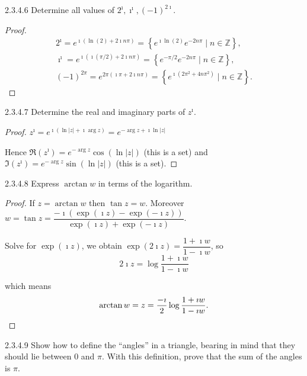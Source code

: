 \begin{problem}{2.3.4.6}
Determine all values of \( 2^{\imath}, \imath^{\imath}, {(-1)}^{2\imath} \).
\end{problem}

\begin{proof}
	\[
		\begin{split}
			2^{\imath} = e^{\imath (\ln(2) + 2\imath n\pi)} = \left\{ e^{\imath \ln(2)} e^{-2n\pi} \mid n \in \mathbb{Z} \right\},         \\
			\imath^{\imath} = e^{\imath (\imath (\pi / 2) + 2\imath n\pi)} = \left\{ e^{-\pi/2} e^{-2n\pi} \mid n \in \mathbb{Z} \right\}, \\
			{(-1)}^{2\pi} = e^{2\pi (\imath \pi + 2\imath n\pi)} = \left\{ e^{\imath (2\pi^{2} + 4n\pi^{2})} \mid n \in \mathbb{Z} \right\}.
		\end{split}
	\]
\end{proof}

\begin{problem}{2.3.4.7}
Determine the real and imaginary parts of \( z^{\imath} \).
\end{problem}

\begin{proof}
	\( z^{\imath} = e^{\imath (\ln\left\vert z\right\vert + \imath \arg z)} = e^{-\arg z + \imath \ln\left\vert z\right\vert} \)

	Hence \( \Re(z^{\imath}) = e^{-\arg z} \cos(\ln\left\vert z \right\vert) \) (this is a set) and \( \Im(z^{\imath}) = e^{-\arg z} \sin(\ln\left\vert z \right\vert) \) (this is a set).
\end{proof}

\begin{problem}{2.3.4.8}
Express \( \arctan w \) in terms of the logarithm.
\end{problem}

\begin{proof}
	If \( z = \arctan w \) then \( \tan z = w \). Moreover \( w = \tan z = \dfrac{-\imath (\exp(\imath z) - \exp(-\imath z))}{\exp(\imath z) + \exp(-\imath z)} \).

	Solve for \( \exp(\imath z) \), we obtain \( \exp(2\imath z) = \dfrac{1 + \imath w}{1 - \imath w} \), so
	\[
		2\imath z = \log\dfrac{1 + \imath w}{1 - \imath w}
	\]

	which means
	\[
		\arctan w = z = \dfrac{-\imath}{2}\log\dfrac{1 + \imath w}{1 - \imath w}. \qedhere
	\]
\end{proof}

\begin{problem}{2.3.4.9}
Show how to define the ``angles'' in a triangle, bearing in mind that they should lie between \( 0 \) and \( \pi \). With this definition, prove that the sum of the angles is \( \pi \).
\end{problem}

